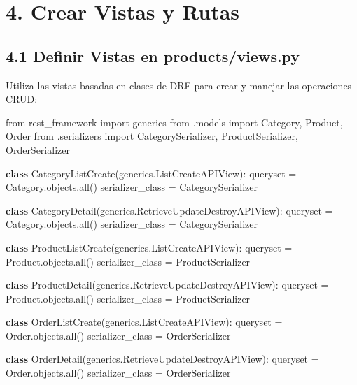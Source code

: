 \documentclass[
  a4paper,
  DIV=11,
  numbers=noendperiod,
  onepage,
  openany]{scrreprt}
\newenvironment{Shaded}{\begin{snugshade}}{\end{snugshade}}
\newcommand{\BuiltInTok}[1]{\textcolor[rgb]{0.00,0.23,0.31}{#1}}
\newcommand{\ImportTok}[1]{\textcolor[rgb]{0.00,0.46,0.62}{#1}}
\newcommand{\KeywordTok}[1]{\textcolor[rgb]{0.00,0.23,0.31}{\textbf{#1}}}
\newcommand{\NormalTok}[1]{\textcolor[rgb]{0.00,0.23,0.31}{#1}}
\newcommand{\OperatorTok}[1]{\textcolor[rgb]{0.37,0.37,0.37}{#1}}
\begin{document}
\section{4. Crear Vistas y Rutas}\label{crear-vistas-y-rutas}

\subsection{4.1 Definir Vistas en
products/views.py}\label{definir-vistas-en-productsviews.py}

Utiliza las vistas basadas en clases de DRF para crear y manejar las
operaciones CRUD:

\begin{Shaded}
\begin{Highlighting}[]
\ImportTok{from}\NormalTok{ rest\_framework }\ImportTok{import}\NormalTok{ generics}
\ImportTok{from}\NormalTok{ .models }\ImportTok{import}\NormalTok{ Category, Product, Order}
\ImportTok{from}\NormalTok{ .serializers }\ImportTok{import}\NormalTok{ CategorySerializer, ProductSerializer, OrderSerializer}

\KeywordTok{class}\NormalTok{ CategoryListCreate(generics.ListCreateAPIView):}
\NormalTok{    queryset }\OperatorTok{=}\NormalTok{ Category.objects.}\BuiltInTok{all}\NormalTok{()}
\NormalTok{    serializer\_class }\OperatorTok{=}\NormalTok{ CategorySerializer}

\KeywordTok{class}\NormalTok{ CategoryDetail(generics.RetrieveUpdateDestroyAPIView):}
\NormalTok{    queryset }\OperatorTok{=}\NormalTok{ Category.objects.}\BuiltInTok{all}\NormalTok{()}
\NormalTok{    serializer\_class }\OperatorTok{=}\NormalTok{ CategorySerializer}

\KeywordTok{class}\NormalTok{ ProductListCreate(generics.ListCreateAPIView):}
\NormalTok{    queryset }\OperatorTok{=}\NormalTok{ Product.objects.}\BuiltInTok{all}\NormalTok{()}
\NormalTok{    serializer\_class }\OperatorTok{=}\NormalTok{ ProductSerializer}

\KeywordTok{class}\NormalTok{ ProductDetail(generics.RetrieveUpdateDestroyAPIView):}
\NormalTok{    queryset }\OperatorTok{=}\NormalTok{ Product.objects.}\BuiltInTok{all}\NormalTok{()}
\NormalTok{    serializer\_class }\OperatorTok{=}\NormalTok{ ProductSerializer}

\KeywordTok{class}\NormalTok{ OrderListCreate(generics.ListCreateAPIView):}
\NormalTok{    queryset }\OperatorTok{=}\NormalTok{ Order.objects.}\BuiltInTok{all}\NormalTok{()}
\NormalTok{    serializer\_class }\OperatorTok{=}\NormalTok{ OrderSerializer}

\KeywordTok{class}\NormalTok{ OrderDetail(generics.RetrieveUpdateDestroyAPIView):}
\NormalTok{    queryset }\OperatorTok{=}\NormalTok{ Order.objects.}\BuiltInTok{all}\NormalTok{()}
\NormalTok{    serializer\_class }\OperatorTok{=}\NormalTok{ OrderSerializer}
\end{Highlighting}
\end{Shaded}
\end{document}

